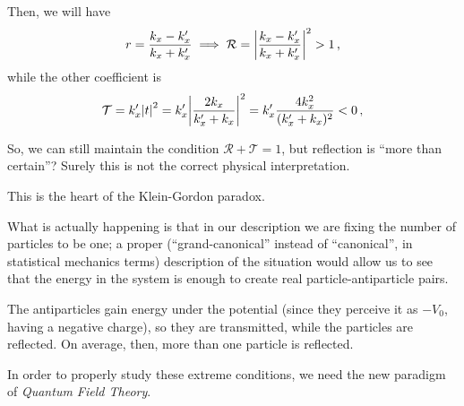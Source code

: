 \documentclass[main.tex]{subfiles}
\begin{document}
Then, we will have 
%
\begin{align}
r = \frac{k_x - k_x^{\prime }}{k_x + k_x^{\prime }} 
\implies 
\mathcal{R} = \abs{\frac{k_x - k_x^{\prime }}{k_x + k_x^{\prime }}}^2 > 1
\,,
\end{align}
%
while the other coefficient is 
%
\begin{align}
\mathcal{T} = k_x^{\prime } \abs{t}^2  
= k_x^{\prime } \abs{\frac{2 k_x}{k_x^{\prime } + k_x}}^2 
= k_x^{\prime } \frac{4 k_x^2}{(k_x^{\prime } + k_x)^2}
< 0
\,,
\end{align}
%

So, we can still maintain the condition \(\mathcal{R} + \mathcal{T} =1\), but reflection is ``more than certain''? Surely this is not the correct physical interpretation. 

This is the heart of the Klein-Gordon paradox. 

What is actually happening is that in our description we are fixing the number of particles to be one; a proper (``grand-canonical'' instead of ``canonical'', in statistical mechanics terms) description of the situation would allow us to see that the energy in the system is enough to create real particle-antiparticle pairs.

The antiparticles gain energy under the potential (since they perceive it as \(-V_0 \), having a negative charge), so they are transmitted, while the particles are reflected. On average, then, more than one particle is reflected. 

In order to properly study these extreme conditions, we need the new paradigm of \emph{Quantum Field Theory}. 
\end{document}
